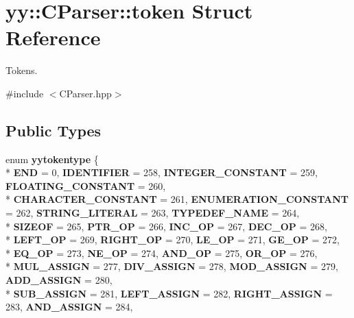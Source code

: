 \hypertarget{structyy_1_1CParser_1_1token}{\section{yy\-:\-:C\-Parser\-:\-:token Struct Reference}
\label{structyy_1_1CParser_1_1token}
}


Tokens.  




{\ttfamily \#include $<$C\-Parser.\-hpp$>$}

\subsection*{Public Types}
\begin{DoxyCompactItemize}
\item 
enum {\bfseries yytokentype} \{ \\*
{\bfseries E\-N\-D} = 0, 
{\bfseries I\-D\-E\-N\-T\-I\-F\-I\-E\-R} = 258, 
{\bfseries I\-N\-T\-E\-G\-E\-R\-\_\-\-C\-O\-N\-S\-T\-A\-N\-T} = 259, 
{\bfseries F\-L\-O\-A\-T\-I\-N\-G\-\_\-\-C\-O\-N\-S\-T\-A\-N\-T} = 260, 
\\*
{\bfseries C\-H\-A\-R\-A\-C\-T\-E\-R\-\_\-\-C\-O\-N\-S\-T\-A\-N\-T} = 261, 
{\bfseries E\-N\-U\-M\-E\-R\-A\-T\-I\-O\-N\-\_\-\-C\-O\-N\-S\-T\-A\-N\-T} = 262, 
{\bfseries S\-T\-R\-I\-N\-G\-\_\-\-L\-I\-T\-E\-R\-A\-L} = 263, 
{\bfseries T\-Y\-P\-E\-D\-E\-F\-\_\-\-N\-A\-M\-E} = 264, 
\\*
{\bfseries S\-I\-Z\-E\-O\-F} = 265, 
{\bfseries P\-T\-R\-\_\-\-O\-P} = 266, 
{\bfseries I\-N\-C\-\_\-\-O\-P} = 267, 
{\bfseries D\-E\-C\-\_\-\-O\-P} = 268, 
\\*
{\bfseries L\-E\-F\-T\-\_\-\-O\-P} = 269, 
{\bfseries R\-I\-G\-H\-T\-\_\-\-O\-P} = 270, 
{\bfseries L\-E\-\_\-\-O\-P} = 271, 
{\bfseries G\-E\-\_\-\-O\-P} = 272, 
\\*
{\bfseries E\-Q\-\_\-\-O\-P} = 273, 
{\bfseries N\-E\-\_\-\-O\-P} = 274, 
{\bfseries A\-N\-D\-\_\-\-O\-P} = 275, 
{\bfseries O\-R\-\_\-\-O\-P} = 276, 
\\*
{\bfseries M\-U\-L\-\_\-\-A\-S\-S\-I\-G\-N} = 277, 
{\bfseries D\-I\-V\-\_\-\-A\-S\-S\-I\-G\-N} = 278, 
{\bfseries M\-O\-D\-\_\-\-A\-S\-S\-I\-G\-N} = 279, 
{\bfseries A\-D\-D\-\_\-\-A\-S\-S\-I\-G\-N} = 280, 
\\*
{\bfseries S\-U\-B\-\_\-\-A\-S\-S\-I\-G\-N} = 281, 
{\bfseries L\-E\-F\-T\-\_\-\-A\-S\-S\-I\-G\-N} = 282, 
{\bfseries R\-I\-G\-H\-T\-\_\-\-A\-S\-S\-I\-G\-N} = 283, 
{\bfseries A\-N\-D\-\_\-\-A\-S\-S\-I\-G\-N} = 284, 

\end{DoxyCompactItemize}
